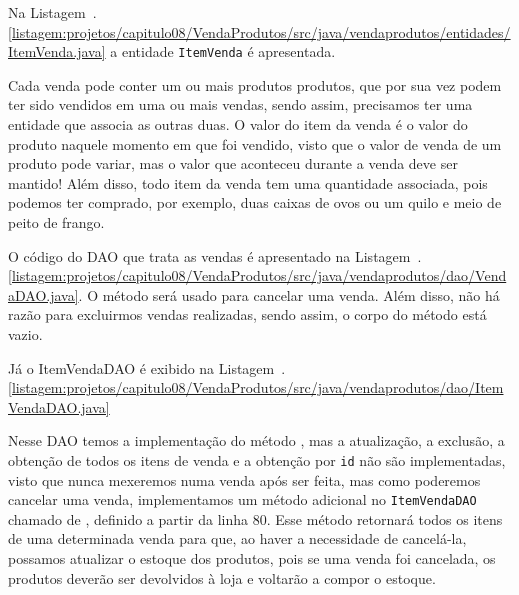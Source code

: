 
Na Listagem~\thechapter.\ref{listagem:projetos/capitulo08/VendaProdutos/src/java/vendaprodutos/entidades/ItemVenda.java} a entidade \texttt{ItemVenda} é apresentada. 


Cada venda pode conter um ou mais produtos produtos, que por sua vez podem ter sido vendidos em uma ou mais vendas, sendo assim, precisamos ter uma entidade que associa as outras duas. O valor do item da venda é o valor do produto naquele momento em que foi vendido, visto que o valor de venda de um produto pode variar, mas o valor que aconteceu durante a venda deve ser mantido! Além disso, todo item da venda tem uma quantidade associada, pois podemos ter comprado, por exemplo, duas caixas de ovos ou um quilo e meio de peito de frango.

O código do DAO que trata as vendas é apresentado na Listagem~\thechapter.\ref{listagem:projetos/capitulo08/VendaProdutos/src/java/vendaprodutos/dao/VendaDAO.java}. O método  será usado para cancelar uma venda. Além disso, não há razão para excluirmos vendas realizadas, sendo assim, o corpo do método está vazio.


Já o ItemVendaDAO é exibido na Listagem~\thechapter.\ref{listagem:projetos/capitulo08/VendaProdutos/src/java/vendaprodutos/dao/ItemVendaDAO.java}


Nesse DAO temos a implementação do método , mas a atualização, a exclusão, a obtenção de todos os itens de venda e a obtenção por \texttt{id} não são implementadas, visto que nunca mexeremos numa venda após ser feita, mas como poderemos cancelar uma venda, implementamos um método adicional no \texttt{ItemVendaDAO} chamado de , definido a partir da linha 80. Esse método retornará todos os itens de uma determinada venda para que, ao haver a necessidade de cancelá-la, possamos atualizar o estoque dos produtos, pois se uma venda foi cancelada, os produtos deverão ser devolvidos à loja e voltarão a compor o estoque.

